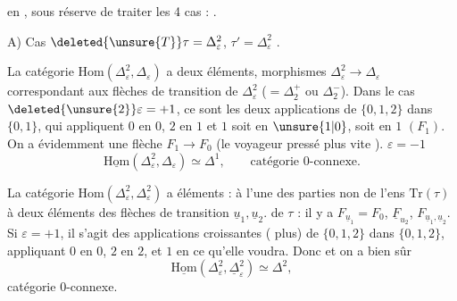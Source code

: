 
en , sous réserve de traiter les 4 cas : .

A) Cas $\deleted{\unsure{T}}\tau=\Delta_{\varepsilon}^{2}$, $\tau'=\Delta_{\varepsilon}^{2}$ . 

La catégorie $\mathrm{Hom}(\Delta_{\varepsilon}^{2},\Delta_{\varepsilon})$ a deux éléments,  morphismes $\Delta_{\varepsilon}^{2}\longrightarrow\Delta_{\varepsilon}$ correspondant aux  flèches de transition de $\Delta_{\varepsilon}^{2}$ ($=\mathbb{\Delta}_{2}^{+}$ ou $\mathbb{\Delta}_{2}^{-}$). Dans le cas $\deleted{\unsure{2}}\varepsilon=+1$, ce sont les deux applications
de $\{0,1,2\}$ dans $\{0,1\}$, qui appliquent $0$ en $0$, $2$ en $1$ et $1$ soit en $\unsure{1|0}$,   soit en $1$ $(F_1)$. On a évidemment une flèche $F_1\longrightarrow F_0$ (le voyageur pressé  plus vite ).    $\varepsilon=-1$
\[
\underline{\mathrm{Hom}}(\Delta_{\varepsilon}^{2},\Delta_{\varepsilon})\simeq\mathbb{\Delta}^{1},\qquad \text{catégorie 0-connexe.}
\]

La catégorie $\mathrm{Hom}(\Delta_{\varepsilon}^{2},\Delta_{\varepsilon}^{2})$ a  éléments :   à l'une des parties non  de l'ens $\mathrm{Tr}(\tau)$ à deux éléments des flèches de transition $\underline u_1,\underline u_2$. de $\tau$ : il y a $F_{\underline u_1}=F_0$, $\underline F_{u_2}$, $F_{\underline u_1,\underline u_2}$. Si $\varepsilon=+1$, il s'agit des applications croissantes ( plus) de $\{0,1,2\}$ dans $\{0,1,2\}$, appliquant $0$  en $0$, $2$ en $2$, et $1$ en ce qu'elle voudra. Donc
et on a bien sûr
\[
\underline{\mathrm{Hom}}(\Delta_{\varepsilon}^{2},\underline{\Delta}_{\varepsilon}^{2})\simeq\mathbb{\Delta}^{2},
\]
catégorie 0-connexe.

